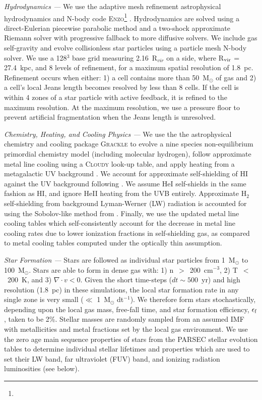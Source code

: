 \documentclass[twocolumn]{aastex61}
\begin{document}
\textit{Hydrodynamics ---} We use the adaptive mesh refinement astrophysical hydrodynamics and N-body code \textsc{Enzo}\footnote{} \citep{Enzo2014}. Hydrodynamics are solved using a direct-Eulerian piecewise parabolic method and a two-shock approximate Riemann solver with progressive fallback to more diffusive solvers. We include gas self-gravity and evolve collisionless star particles using a particle mesh N-body solver. We use a 128$^{3}$ base grid measuring 2.16~R$_{vir}$ on a side, where R$_{\rm vir}$ = 27.4~kpc, and 8 levels of refinement, for a maximum spatial resolution of 1.8~pc. Refinement occurs when either: 1) a cell contains more than 50~M$_{\odot}$ of gas and 2) a cell's local Jeans length becomes resolved by less than 8 cells. If the cell is within 4 zones of a star particle with active feedback, it is refined to the maximum resolution. At the maximum resolution, we use a pressure floor to prevent artificial fragmentation when the Jeans length is unresolved.

\textit{Chemistry, Heating, and Cooling Physics ---} We use the the astrophysical chemistry and cooling package \textsc{Grackle} \citep{GrackleMethod} to evolve a nine species non-equilibrium primordial chemistry model (including molecular hydrogen), follow approximate metal line cooling using a \textsc{Cloudy} look-up table, and apply heating from a metagalactic UV background \citep{HM2012}. We account for approximate self-shielding of HI against the UV background following \cite{Rahmati2013}. We assume HeI self-shields in the same fashion as HI, and ignore HeII heating from the UVB entirely. Approximate H$_2$ self-shielding from background Lyman-Werner (LW) radiation is accounted for using the Sobolov-like method from \cite{Wolcott-Green2011}. Finally, we use the updated metal line cooling tables which self-consistently account for the decrease in metal line cooling rates due to lower ionization fractions in self-shielding gas, as compared to metal cooling tables computed under the optically thin assumption. 

\textit{Star Formation ---} Stars are followed as individual star particles from 1~M$_{\odot}$ to 100~M$_{\odot}$. Stars are able to form in dense gas with: 1) n~$>$~200~cm$^{-3}$, 2) T~$<$~200~K, and 3) $\nabla \cdot v < 0$. Given the short time-steps ($dt \sim 500$~yr) and high resolution (1.8~pc) in these simulations, the local star formation rate in any single zone is very small ($\ll$ 1~M$_{\odot}$ dt$^{-1}$). We therefore form stars stochastically, depending upon the local gas mass, free-fall time, and star formation efficiency, $\epsilon_{\rm f}$, taken to be 2\%. Stellar masses are randomly sampled from an assumed \cite{Salpeter1955} IMF with metallicities and metal fractions set by the local gas environment. We use the zero age main sequence properties of stars from the \textsc{PARSEC} stellar evolution tables \citep{Bressan2012,Tang2014} to determine individual stellar lifetimes and properties which are used to set their LW band, far ultraviolet (FUV) band, and ionizing radiation luminosities (see below).
\end{document}
